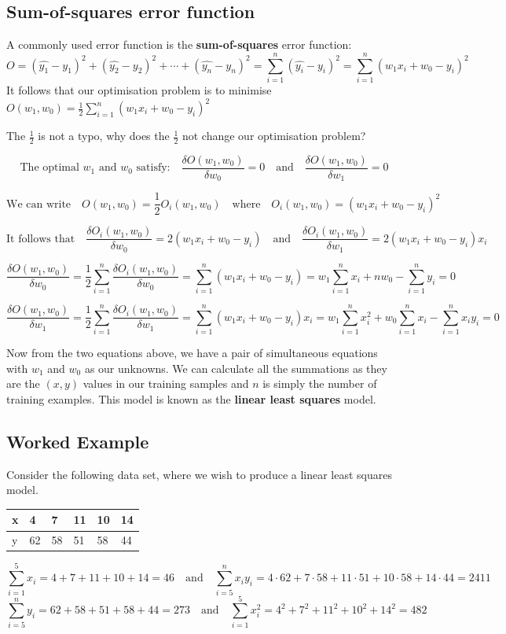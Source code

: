 \documentclass[11pt,fleqn]{book} %
\begin{document}
\subsection{Sum-of-squares error function}
A commonly used error function is the \textbf{sum-of-squares} error function:
$$O = (\hat{y_1} - y_1)^2 + (\hat{y_2} - y_2)^2 + \cdots + (\hat{y_n} - y_n)^2 = \sum^n_{i=1}(\hat{y_i} - y_i)^2 = \sum^n_{i=1}(w_1x_i + w_0 - y_i)^2$$
It follows that our optimisation problem is to minimise $O(w_1, w_0) = \frac{1}{2}\sum^n_{i = 1}(w_1x_i + w_0 - y_i)^2$

\begin{exercise}
	The $\frac{1}{2}$ is not a typo, why does the $\frac{1}{2}$ not change our optimisation problem?
\end{exercise}

$$\text{The optimal $w_1$ and $w_0$ satisfy:} \quad \frac{\delta O(w_1, w_0)}{\delta w_0} = 0 \quad \text{and} \quad \frac{\delta O(w_1, w_0)}{\delta w_1} = 0 $$

$$\text{We can write} \quad O(w_1, w_0) = \frac{1}{2} O_i(w_1, w_0) \quad \text{where} \quad O_i(w_1, w_0) = (w_1x_i + w_0 - y_i)^2$$

$$\text{It follows that} \quad \frac{\delta O_i(w_1, w_0)}{\delta w_0} = 2(w_1x_i + w_0 - y_i) \quad \text{and} \quad \frac{\delta O_i(w_1, w_0)}{\delta w_1} = 2(w_1x_i + w_0 - y_i)x_i$$

$$\frac{\delta O(w_1, w_0)}{\delta w_0} = \frac{1}{2}\sum_{i=1}^n\frac{\delta O_i(w_1, w_0)}{\delta w_0} = \sum^n_{i=1}(w_1x_i + w_0 - y_i) = w_1 \sum^n_{i=1} x_i + nw_0 - \sum^n_{i=1} y_i = 0$$

$$\frac{\delta O(w_1, w_0)}{\delta w_1} = \frac{1}{2}\sum_{i=1}^n\frac{\delta O_i(w_1, w_0)}{\delta w_1} = \sum^n_{i=1}(w_1x_i + w_0 - y_i)x_i = w_1 \sum^n_{i=1} x_i^2 + w_0 \sum^n_{i=1} x_i - \sum^n_{i=1} x_iy_i = 0$$

\noindent
Now from the two equations above, we have a pair of simultaneous equations with $w_1$ and $w_0$ as our unknowns. We can calculate all the summations as they are the $(x, y)$ values in our training samples and $n$ is simply the number of training examples. This model is known as the \textbf{linear least squares} model.

\subsection*{Worked Example}
Consider the following data set, where we wish to produce a linear least squares model.
\begin{table}[h]
\centering
\begin{tabular}{l|lllll}
x & 4  & 7  & 11 & 10 & 14 \\ \hline
y & 62 & 58 & 51 & 58 & 44
\end{tabular}
\end{table}
$$ \sum^5_{i=1} x_i = 4 + 7 + 11 + 10 + 14 = 46 \quad \text{and} \quad \sum^n_{i=5} x_iy_i = 4 \cdot 62 + 7 \cdot 58 + 11 \cdot 51 + 10 \cdot 58 + 14 \cdot 44 = 2411$$
$$ \sum^n_{i=5} y_i = 62 + 58 + 51 + 58 + 44 = 273 \quad \text{and} \quad \sum^5_{i=1} x_i^2 = 4^2 + 7^2 + 11^2 + 10^2 + 14^2 = 482$$
\end{document}
